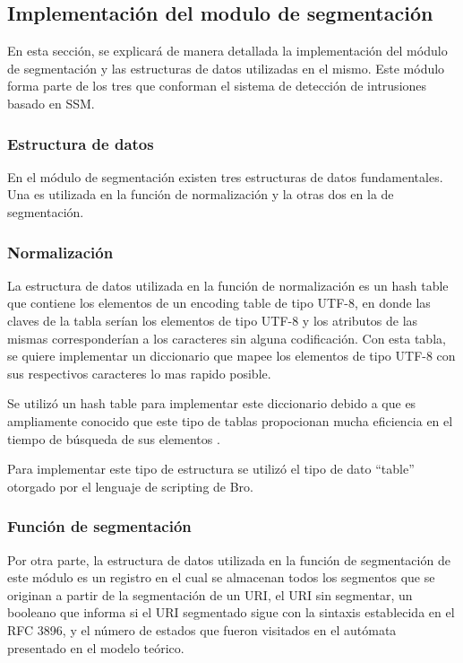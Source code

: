 \subsection{Implementación del modulo de segmentación}

En esta sección, se explicará de manera detallada la implementación del módulo de segmentación y las estructuras de datos utilizadas en el mismo. Este módulo forma parte de los tres que conforman el sistema de detección de intrusiones basado en SSM.

\subsubsection{Estructura de datos}
\label{sssec:estructuraNormalizacion}

En el módulo de segmentación existen tres estructuras de datos fundamentales. Una es utilizada en la función de normalización y la otras dos en
la de segmentación.

\subsubsection*{Normalización}
\label{sssec:estructuraNormalizacion}

La estructura de datos utilizada en la función de normalización es un hash table que contiene los elementos de un encoding table de tipo UTF-8, en donde las claves de la tabla serían los elementos de tipo UTF-8 y los atributos de las mismas corresponderían a los caracteres sin alguna codificación. Con esta tabla, se quiere implementar un diccionario que mapee los elementos de tipo UTF-8 con sus respectivos caracteres lo mas rapido posible.

Se utilizó un hash table para implementar este diccionario debido a que es ampliamente conocido que este tipo de tablas propocionan mucha eficiencia en el tiempo de búsqueda de sus elementos \cite{Cormen}.

Para implementar este tipo de estructura se utilizó el tipo de dato ``table'' otorgado por el lenguaje de scripting de Bro.

\subsubsection*{Función de segmentación}
\label{sssec:estructuraSegmentacion}

Por otra parte, la estructura de datos utilizada en la función de segmentación de este módulo es un registro en el cual se almacenan todos los segmentos que se originan a partir de la segmentación de un URI, el URI sin segmentar, un booleano que informa si el URI segmentado sigue con la sintaxis establecida en el RFC 3896, y el número de estados que fueron visitados en el autómata presentado en el modelo teórico.
 

